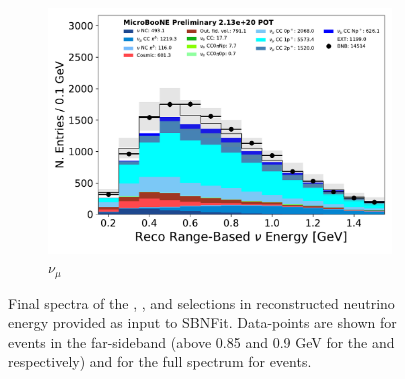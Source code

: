 \begin{figure}[ht]
\begin{center}
\begin{subfigure}[b]{0.28\textwidth}
    \includegraphics[width=1.00\textwidth]{NuMuCCsel/Images/Ryan/fullselection_run3_fullsystematics/reco_nu_e_range_v_08052020_fullsel_samples_noratio_event_category.pdf}
    \caption{\label{fig:intro:nueselections:numu} $\nu_{\mu}$}
    \end{subfigure}
\caption{\label{fig:intro:nueselections} Final spectra of the \npsel, \zpsel, and \numu selections in reconstructed neutrino energy provided as input to SBNFit. Data-points are shown for \nue events in the far-sideband (above 0.85 and 0.9 GeV for the \npsel and \zpsel respectively) and for the full spectrum for \numu events.}
\end{center}
\end{figure}



